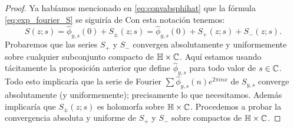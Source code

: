 \documentclass[../../tesis_maestria]{subfiles}
\begin{document}
\begin{proof}
  Ya hab\'iamos mencionado en \eqref{eq:convabsphihat} que la f\'ormula \eqref{eq:exp_fourier_S}
  se siguir\'ia de 
  Con esta notaci\'on tenemos:
  \[
    S(z;s)=\hat{\phi}_{y,s}(0)+S_{\pm}(z;s)=\hat{\phi}_{y,s}(0)+S_+(z;s)+S_-(z;s).
  \]
  Probaremos que las series $S_+$ y $S_-$ convergen  absolutamente y uniformemente sobre
  cualquier subconjunto compacto de $\mathbb{H}\times\mathbb{C}$. Aqu\'i estamos usando t\'acitamente la
  proposici\'on anterior que define $\hat{\phi}_{y,s}$ para todo valor de $s\in\mathbb{C}$.
  Todo esto implicar\'ia que la serie de Fourier $\sum\hat{\phi}_{y,s}(n)e^{2\pi inx}$ de
  $S_{y,s}$ converge absolutamente (y uniformemente); precisamente lo que necesitamos.
  Adem\'as implicar\'ia que $S_{\pm}(z;s)$ es holomorfa sobre $\mathbb{H}\times\mathbb{C}$. Procedemos
  a probar la convergencia absoluta y uniforme de $S_+$ y $S_-$ sobre compactos de
  $\mathbb{H}\times\mathbb{C}$.
  

\end{proof}
\end{document}
